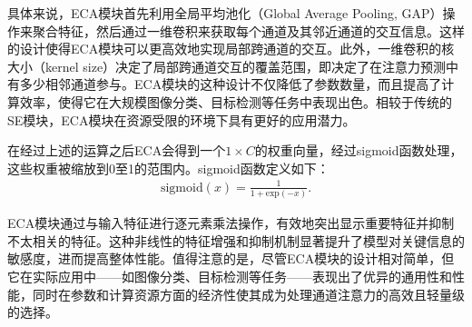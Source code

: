 具体来说，ECA模块首先利用全局平均池化（Global Average Pooling, GAP）操作来聚合特征，然后通过一维卷积来获取每个通道及其邻近通道的交互信息。这样的设计使得ECA模块可以更高效地实现局部跨通道的交互。此外，一维卷积的核大小（kernel size）决定了局部跨通道交互的覆盖范围，即决定了在注意力预测中有多少相邻通道参与。ECA模块的这种设计不仅降低了参数数量，而且提高了计算效率，使得它在大规模图像分类、目标检测等任务中表现出色。相较于传统的SE模块，ECA模块在资源受限的环境下具有更好的应用潜力。

在经过上述的运算之后ECA会得到一个$1 \times C$的权重向量，经过sigmoid函数处理，这些权重被缩放到0至1的范围内。sigmoid函数定义如下：
\begin{equation}
\begin{aligned}
\text{sigmoid}(x) = \frac{1}{1 + \text{exp}(-x)}.
\end{aligned}
\label{equ: sigmoid}
\end{equation}

ECA模块通过与输入特征进行逐元素乘法操作，有效地突出显示重要特征并抑制不太相关的特征。这种非线性的特征增强和抑制机制显著提升了模型对关键信息的敏感度，进而提高整体性能。值得注意的是，尽管ECA模块的设计相对简单，但它在实际应用中——如图像分类、目标检测等任务——表现出了优异的通用性和性能，同时在参数和计算资源方面的经济性使其成为处理通道注意力的高效且轻量级的选择。







